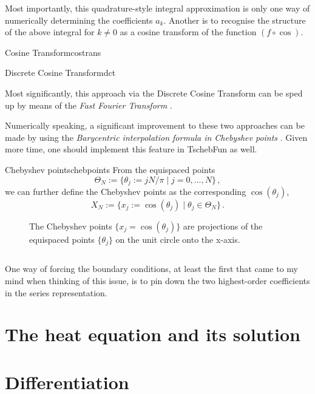 \documentclass[12pt, a4paper]{article}
\begin{document}
  Most importantly, this quadrature-style integral approximation is only one way of numerically determining the coefficients $a_k$.
  Another is to recognise the structure of the above integral for $k \neq 0$ as a cosine transform of the function $(f \circ \cos)$.

  \begin{definition}{Cosine Transform}{costrans}
  \end{definition}

  \begin{definition}{Discrete Cosine Transform}{dct}
  \end{definition}

  Most significantly, this approach via the Discrete Cosine Transform can be sped up by means of the \emph{Fast Fourier Transform} \parencite{cooley-tukey-fft}.

  Numerically speaking, a significant improvement to these two approaches can be made by using the \emph{Barycentric interpolation formula in Chebyshev points} \parencite{atap}.
  Given more time, one should implement this feature in TschebFun as well.

  \begin{definition}{Chebyshev points}{chebpoints}
    From the equispaced points
    $$\Theta_N := \{\theta_j := jN/\pi \;|\; j = 0, ..., N\} \,,$$
    we can further define the Chebyshev points as the corresponding $\cos(\theta_j)$,
    $$X_N := \{x_j := \cos(\theta_j) \;|\; \theta_j \in \Theta_N\} \,.$$
  \end{definition}

  \begin{figure}[H]
    \centering
    \caption{The Chebyshev points $\{x_j = \cos(\theta_j)\}$ are projections of the equispaced points $\{\theta_j\}$ on the unit circle onto the x-axis.}
  \end{figure}

  \inputminted{cpp}{../solver/TschebFun.h}

  One way of forcing the boundary conditions, at least the first that came to my mind when thinking of this issue, is to pin down the two highest-order coefficients in the series representation.

  \section{The heat equation and its solution}
  \section{Differentiation}
\end{document}
